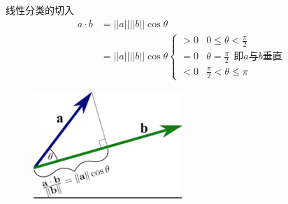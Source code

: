 \documentclass[handout]{ctexbeamer}
\begin{document}
\begin{frame}{线性分类的切入}
	\begin{align*}
		a \cdot b & = ||a|| ||b|| \cos \theta \\
		&= ||a|| ||b|| \cos \theta  \begin{cases}
		> 0 &  0 \leq \theta < \frac{\pi}{2} \\
		= 0 & \theta = \frac{\pi}{2}  \ \ \text{即$a$与$b$垂直} \\
		< 0 &  \frac{\pi}{2} < \theta \leq \pi 
	\end{cases}
	\end{align*}
	\begin{figure}[H]
		\centering
		\includegraphics[width=0.5\textwidth]{fig/C2C2svmprojc}
	\end{figure}
\end{frame}
\end{document}
